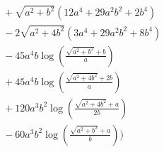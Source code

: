\begin{align*}
&\phantom{{}=\frac{1}{90 a^{4} b^{2}}\Bigg(}+ \sqrt{a^{2} + b^{2}}\left(12 a^{4} + 29 a^{2} b^{2} + 2 b^{4}\right)\\
&\phantom{{}=\frac{1}{90 a^{4} b^{2}}\Bigg(}- 2 \sqrt{a^{2} + 4 b^{2}}\left(3 a^{4} + 29 a^{2} b^{2} + 8 b^{4}\right)\\
&\phantom{{}=\frac{1}{90 a^{4} b^{2}}\Bigg(}- 45 a^{4} b \log\left(\frac{\sqrt{a^{2} + b^{2}} + b}{a}\right)\\
&\phantom{{}=\frac{1}{90 a^{4} b^{2}}\Bigg(}+ 45 a^{4} b \log\left(\frac{\sqrt{a^{2} + 4 b^{2}} + 2 b}{a}\right)\\
&\phantom{{}=\frac{1}{90 a^{4} b^{2}}\Bigg(}+ 120 a^{3} b^{2} \log\left(\frac{\sqrt{a^{2} + 4 b^{2}} + a}{2 b}\right)\\
&\phantom{{}=\frac{1}{90 a^{4} b^{2}}\Bigg(}- 60 a^{3} b^{2} \log\left(\frac{\sqrt{a^{2} + b^{2}} + a}{b}\right)\Bigg)
\end{align*}
